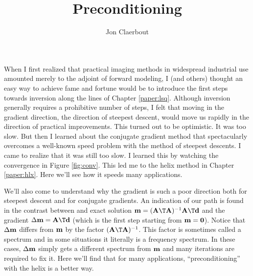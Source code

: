 
\def\sx#1{}
\def\bx#1{#1}
\def\eq{\quad =\quad}

\title{Preconditioning}
\author{Jon Claerbout}
\maketitle

\label{paper:prc}
\sx{precondition}



When I first realized that practical imaging methods in widespread
industrial use amounted merely to the adjoint of forward modeling,
I (and others) thought an easy way to achieve fame and fortune
would be to introduce the first steps towards inversion
along the lines of Chapter \ref{paper:lsq}.
Although inversion generally requires a prohibitive number
of steps, I felt that moving in the gradient direction,
the direction of steepest descent, would move us rapidly
in the direction of practical improvements.
This turned out to be optimistic.
It was too slow.
But then I learned about the conjugate gradient method that
spectacularly overcomes a well-known speed problem with the
method of steepest descents.
I came to realize that it was still too slow.
I learned this by watching the convergence in Figure
\ref{fig:conv}.
This led me to the helix method in Chapter \ref{paper:hlx}.
Here we'll see how it speeds many applications.

\par
We'll also come to understand why the gradient is such a poor direction
both for steepest descent and for conjugate gradients.
An indication of our path is found in the contrast between
and exact solution
$\bold m = (\bold A\T\bold A)^{-1}\bold A\T\bold d$ and the
gradient
$\Delta \bold m = \bold A\T\bold d$
(which is the first step starting from $\bold m =\bold 0$).
Notice that $\Delta \bold m$ differs from $\bold m$
by the factor $(\bold A\T\bold A)^{-1}$.
This factor is sometimes called a spectrum
and in some situations it literally is a frequency spectrum.
In these cases, $\Delta \bold m$ simply gets a different
spectrum from $\bold m$ and many iterations are required to fix it.
Here we'll find that for many applications,
``preconditioning'' with the helix is a better way.



